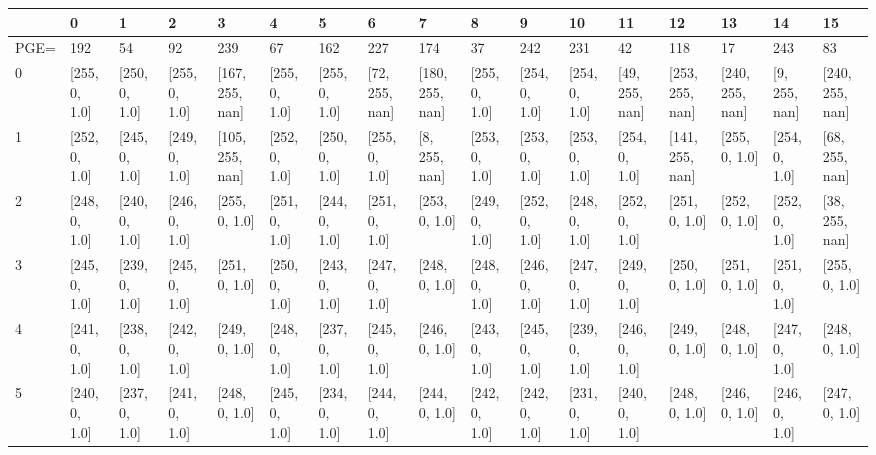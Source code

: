 \begin{tabular}{lllllllllllllllll}
\toprule
{} &             0  &             1  &             2  &               3  &             4  &             5  &              6  &               7  &             8  &             9  &             10 &              11 &               12 &               13 &             14 &               15 \\
\midrule
PGE= &            192 &             54 &             92 &              239 &             67 &            162 &             227 &              174 &             37 &            242 &            231 &              42 &              118 &               17 &            243 &               83 \\
0    &  [255, 0, 1.0] &  [250, 0, 1.0] &  [255, 0, 1.0] &  [167, 255, nan] &  [255, 0, 1.0] &  [255, 0, 1.0] &  [72, 255, nan] &  [180, 255, nan] &  [255, 0, 1.0] &  [254, 0, 1.0] &  [254, 0, 1.0] &  [49, 255, nan] &  [253, 255, nan] &  [240, 255, nan] &  [9, 255, nan] &  [240, 255, nan] \\
1    &  [252, 0, 1.0] &  [245, 0, 1.0] &  [249, 0, 1.0] &  [105, 255, nan] &  [252, 0, 1.0] &  [250, 0, 1.0] &   [255, 0, 1.0] &    [8, 255, nan] &  [253, 0, 1.0] &  [253, 0, 1.0] &  [253, 0, 1.0] &   [254, 0, 1.0] &  [141, 255, nan] &    [255, 0, 1.0] &  [254, 0, 1.0] &   [68, 255, nan] \\
2    &  [248, 0, 1.0] &  [240, 0, 1.0] &  [246, 0, 1.0] &    [255, 0, 1.0] &  [251, 0, 1.0] &  [244, 0, 1.0] &   [251, 0, 1.0] &    [253, 0, 1.0] &  [249, 0, 1.0] &  [252, 0, 1.0] &  [248, 0, 1.0] &   [252, 0, 1.0] &    [251, 0, 1.0] &    [252, 0, 1.0] &  [252, 0, 1.0] &   [38, 255, nan] \\
3    &  [245, 0, 1.0] &  [239, 0, 1.0] &  [245, 0, 1.0] &    [251, 0, 1.0] &  [250, 0, 1.0] &  [243, 0, 1.0] &   [247, 0, 1.0] &    [248, 0, 1.0] &  [248, 0, 1.0] &  [246, 0, 1.0] &  [247, 0, 1.0] &   [249, 0, 1.0] &    [250, 0, 1.0] &    [251, 0, 1.0] &  [251, 0, 1.0] &    [255, 0, 1.0] \\
4    &  [241, 0, 1.0] &  [238, 0, 1.0] &  [242, 0, 1.0] &    [249, 0, 1.0] &  [248, 0, 1.0] &  [237, 0, 1.0] &   [245, 0, 1.0] &    [246, 0, 1.0] &  [243, 0, 1.0] &  [245, 0, 1.0] &  [239, 0, 1.0] &   [246, 0, 1.0] &    [249, 0, 1.0] &    [248, 0, 1.0] &  [247, 0, 1.0] &    [248, 0, 1.0] \\
5    &  [240, 0, 1.0] &  [237, 0, 1.0] &  [241, 0, 1.0] &    [248, 0, 1.0] &  [245, 0, 1.0] &  [234, 0, 1.0] &   [244, 0, 1.0] &    [244, 0, 1.0] &  [242, 0, 1.0] &  [242, 0, 1.0] &  [231, 0, 1.0] &   [240, 0, 1.0] &    [248, 0, 1.0] &    [246, 0, 1.0] &  [246, 0, 1.0] &    [247, 0, 1.0] \\

\end{tabular}
